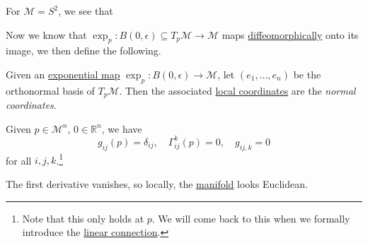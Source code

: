 For \(\mathcal{M} = S^2\), we see that
\begin{center}
\end{center}

Now we know that \(\exp _p\colon B(0, \epsilon ) \subseteq T_p \mathcal{M} \to \mathcal{M} \) maps \hyperref[def:diffeomorphic]{diffeomorphically} onto its image, we then define the following.

\begin{definition}\label{def:normal-coordinate}
	Given an \hyperref[def:exponential-map]{exponential map} \(\exp _p\colon B(0, \epsilon ) \to \mathcal{M} \), let \((e_1, \ldots , e_n)\) be the orthonormal basis of \(T_p \mathcal{M} \). Then the associated \hyperref[def:coordinate-chart]{local coordinates} are the \emph{normal coordinates}.
\end{definition}

Given \(p\in \mathcal{M} ^n\), \(0\in \mathbb{R} ^n\), we have
\[
	g_{ij}(p) = \delta_{ij},\quad \Gamma _{ij}^k(p) = 0,\quad g_{ij, k} = 0
\]
for all \(i, j, k\).\footnote{Note that this only holds at \(p\). We will come back to this when we formally introduce the \hyperref[def:linear-connection]{linear connection}.}

\begin{note}
	The first derivative vanishes, so locally, the \hyperref[def:Riemannian-manifold]{manifold} looks Euclidean.
\end{note}

